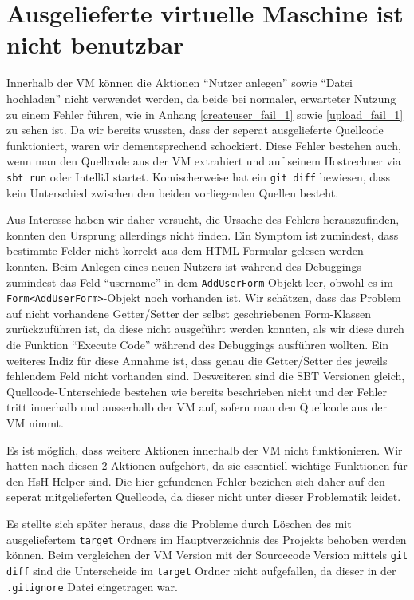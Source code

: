 \documentclass[12pt,DIV14,BCOR10mm,a4paper,parskip=half-,headsepline,headinclude,english,ngerman,bibliography=totocnumbered]{scrreprt}
\begin{document}
\vspace*{-3cm}

\tableofcontents  %

\chapter{Ausgelieferte virtuelle Maschine ist nicht benutzbar}

Innerhalb der VM können die Aktionen \enquote{Nutzer anlegen} sowie \enquote{Datei hochladen} nicht verwendet werden, da beide bei normaler, erwarteter Nutzung zu einem Fehler führen, wie in Anhang \ref{createuser_fail_1} sowie \ref{upload_fail_1} zu sehen ist.
Da wir bereits wussten, dass der seperat ausgelieferte Quellcode funktioniert, waren wir dementsprechend schockiert. 
Diese Fehler bestehen auch, wenn man den Quellcode aus der VM extrahiert und auf seinem Hostrechner via \texttt{sbt run} oder IntelliJ startet.
Komischerweise hat ein \texttt{git diff} bewiesen, dass kein Unterschied zwischen den beiden vorliegenden Quellen besteht.

Aus Interesse haben wir daher versucht, die Ursache des Fehlers herauszufinden, konnten den Ursprung allerdings nicht finden.
Ein Symptom ist zumindest, dass bestimmte Felder nicht korrekt aus dem HTML-Formular gelesen werden konnten.
Beim Anlegen eines neuen Nutzers ist während des Debuggings zumindest das Feld \enquote{username} in dem \texttt{AddUserForm}-Objekt leer, obwohl es im \texttt{Form<AddUserForm>}-Objekt noch vorhanden ist.
Wir schätzen, dass das Problem auf nicht vorhandene Getter/Setter der selbst geschriebenen Form-Klassen zurückzuführen ist, da diese nicht ausgeführt werden konnten, als wir diese durch die Funktion \enquote{Execute Code} während des Debuggings ausführen wollten.
Ein weiteres Indiz für diese Annahme ist, dass genau die Getter/Setter des jeweils fehlendem Feld nicht vorhanden sind.
Desweiteren sind die SBT Versionen gleich, Quellcode-Unterschiede bestehen wie bereits beschrieben nicht und der Fehler tritt innerhalb und ausserhalb der VM auf, sofern man den Quellcode aus der VM nimmt.

Es ist möglich, dass weitere Aktionen innerhalb der VM nicht funktionieren. Wir hatten nach diesen 2 Aktionen aufgehört, da sie essentiell wichtige Funktionen für den HsH-Helper sind.
Die hier gefundenen Fehler beziehen sich daher auf den seperat mitgelieferten Quellcode, da dieser nicht unter dieser Problematik leidet.

Es stellte sich später heraus, dass die Probleme durch Löschen des mit ausgeliefertem \texttt{target} Ordners im Hauptverzeichnis des Projekts behoben werden können. Beim vergleichen der VM Version mit der Sourcecode Version mittels \texttt{git diff} sind die Unterscheide im \texttt{target} Ordner nicht aufgefallen, da dieser in der \texttt{.gitignore} Datei eingetragen war.
\end{document}
